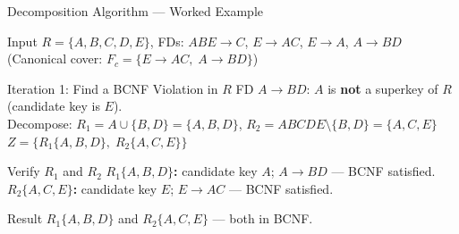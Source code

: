 \begin{frame}{Decomposition Algorithm --- Worked Example}
  \begin{block}{Input}
    $R = \{A, B, C, D, E\}$, \quad FDs: $ABE \to C$, $E \to AC$, $E \to A$, $A \to BD$\\
    (Canonical cover: $F_c = \{E \to AC, \; A \to BD\}$)
  \end{block}

  \begin{block}{Iteration 1: Find a BCNF Violation in $R$}
    FD $A \to BD$: $A$ is \textbf{not} a superkey of $R$ (candidate key is $E$).\\
    Decompose: $R_1 = A \cup \{B, D\} = \{A, B, D\}$, \quad
    $R_2 = ABCDE \setminus \{B, D\} = \{A, C, E\}$\\
    $Z = \{R_1\{A,B,D\},\; R_2\{A,C,E\}\}$
  \end{block}

  \begin{block}{Verify $R_1$ and $R_2$}
    \textbf{$R_1\{A,B,D\}$:} candidate key $A$; \; $A \to BD$ --- BCNF satisfied. \checkmark\\
    \textbf{$R_2\{A,C,E\}$:} candidate key $E$; \; $E \to AC$ --- BCNF satisfied. \checkmark
  \end{block}

  \begin{block}{Result}
    $R_1\{A,B,D\}$ and $R_2\{A,C,E\}$ --- both in BCNF.
  \end{block}
\end{frame}

